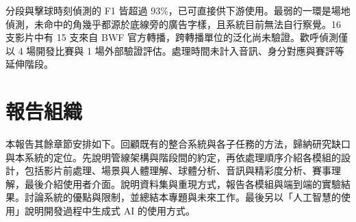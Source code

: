 分段與擊球時刻偵測的 F1 皆超過 93\%，已可直接供下游使用。最弱的一環是場地偵測，未命中的角幾乎都源於底線旁的廣告字樣，且系統目前無法自行察覺。16 支影片中有 15 支來自 BWF 官方轉播，跨轉播單位的泛化尚未驗證。歡呼偵測僅以 4 場開發比賽與 1 場外部驗證評估。處理時間未計入音訊、身分對應與賽評等延伸階段。

\section{報告組織}
\label{sec:organization}

本報告其餘章節安排如下。回顧既有的整合系統與各子任務的方法，歸納研究缺口與本系統的定位。先說明管線架構與階段間的約定，再依處理順序介紹各模組的設計，包括影片前處理、場景與人體理解、球體分析、音訊與精彩度分析、賽事理解，最後介紹使用者介面。說明資料集與重現方式，報告各模組與端到端的實驗結果。討論系統的優點與限制，並總結本專題與未來工作。最後另以「人工智慧的使用」說明開發過程中生成式 AI 的使用方式。
